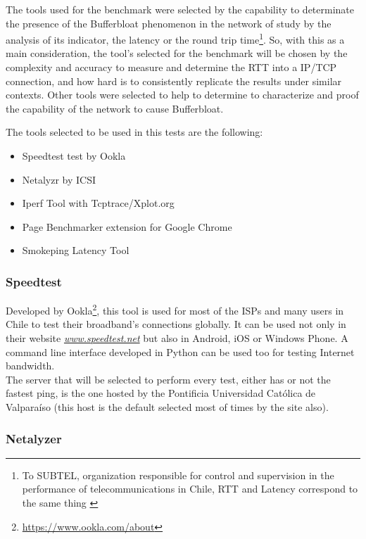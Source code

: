 The tools used for the benchmark were selected by the capability to determinate 
the presence of the Bufferbloat phenomenon in the network of study by the 
analysis of its indicator, the latency or the round trip time\footnote{To 
SUBTEL, organization responsible for control and supervision in the performance 
of telecommunications in Chile, RTT and Latency correspond to the same thing 
\cite{subtel} }. So, with this as a main consideration, the tool's selected for 
the benchmark will be chosen by the complexity and accuracy to measure and 
determine the RTT into a IP/TCP connection, and how hard is to consistently 
replicate the results under similar contexts. Other tools were selected to help 
to determine to characterize and proof the capability of the network to cause 
Bufferbloat.\\

\newpage 

The tools selected to be used in this tests are the following:

\begin{itemize}
    \item Speedtest test by Ookla
    \item Netalyzr by ICSI
    \item Iperf Tool with Tcptrace/Xplot.org
    \item Page Benchmarker extension for Google Chrome
    \item Smokeping Latency Tool
\end{itemize}

\subsubsection{Speedtest}

Developed by Ookla\footnote{\url{https://www.ookla.com/about}}, this tool is used
for most of the ISPs and many users in Chile to test their broadband's
connections globally. It can be used not only in their website 
\href{http://www.speedtest.net}{\textit{www.speedtest.net}} but also in Android,
iOS or Windows Phone. A command line interface developed in Python can be used 
too for testing Internet bandwidth.\\

The server that will be selected to perform every test, either has or not the
fastest ping, is the one hosted by the Pontificia Universidad Cat\'olica de
Valpara\'iso (this host is the default selected most of times by the site also).  

\subsubsection{Netalyzer}


